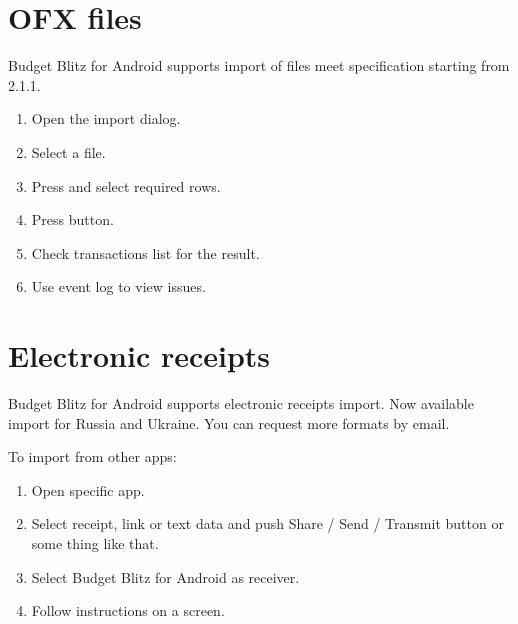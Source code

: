 \documentclass[a4paper,10pt,english]{sphinxmanual}
\begin{document}
\section{OFX files}
\label{\detokenize{import:ofx-files}}
\sphinxAtStartPar
Budget Blitz for Android supports import of  files meet specification starting from 2.1.1.
\begin{enumerate}
%
\item {} 
\sphinxAtStartPar
Open the import dialog.

\item {} 
\sphinxAtStartPar
Select a file.

\item {} 
\sphinxAtStartPar
Press  and select required rows.

\item {} 
\sphinxAtStartPar
Press  button.

\item {} 
\sphinxAtStartPar
Check transactions list for the result.

\item {} 
\sphinxAtStartPar
Use event log to view issues.

\end{enumerate}

\noindent{}

\noindent{}


\section{Electronic receipts}
\label{\detokenize{import:electronic-receipts}}
\sphinxAtStartPar
Budget Blitz for Android supports electronic receipts import. Now available import for Russia and Ukraine. You can request more formats by email.

\sphinxAtStartPar
To import from other apps:
\begin{enumerate}
%
\item {} 
\sphinxAtStartPar
Open specific app.

\item {} 
\sphinxAtStartPar
Select receipt, link or text data and push Share / Send / Transmit button or some thing like that.

\item {} 
\sphinxAtStartPar
Select Budget Blitz for Android as receiver.

\item {} 
\sphinxAtStartPar
Follow instructions on a screen.

\end{enumerate}
\end{document}
